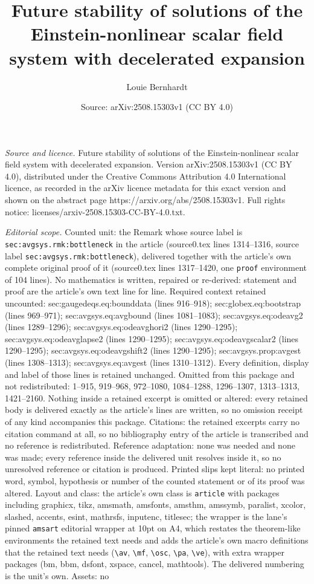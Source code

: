\documentclass[10pt,a4paper]{amsart}
\title[Future stability of solutions of the Einstein-nonlinear scal]{Future stability of solutions of the Einstein-nonlinear scalar field system with decelerated expansion}
\author{Louie Bernhardt}
\date{Source: arXiv:2508.15303v1 (CC BY 4.0)}
\begin{document}
\maketitle

\noindent\emph{Source and licence.} Future stability of solutions of the Einstein-nonlinear scalar field system with decelerated expansion. Version arXiv:2508.15303v1 (CC BY 4.0), distributed under the Creative Commons Attribution 4.0 International licence, as recorded in the arXiv licence metadata for this exact version and shown on the abstract page https://arxiv.org/abs/2508.15303v1. Full rights notice: licenses/arxiv-2508.15303-CC-BY-4.0.txt.\par\smallskip

\noindent\textit{Editorial scope.} Counted unit: the Remark whose source label is \texttt{sec:avgsys.rmk:bottleneck} in the article (source0.tex lines 1314--1316, source label \texttt{sec:avgsys.rmk:bottleneck}), delivered together with the article's own complete original proof of it (source0.tex lines 1317--1420, one \texttt{proof} environment of 104 lines). No mathematics is written, repaired or re-derived: statement and proof are the article's own text line for line. Required context retained uncounted: sec:gaugedeqs.eq:bounddata (lines 916--918); sec:globex.eq:bootstrap (lines 969--971); sec:avgsys.eq:avgbound (lines 1081--1083); sec:avgsys.eq:odeavg2 (lines 1289--1296); sec:avgsys.eq:odeavghori2 (lines 1290--1295); sec:avgsys.eq:odeavglapse2 (lines 1290--1295); sec:avgsys.eq:odeavgscalar2 (lines 1290--1295); sec:avgsys.eq:odeavgshift2 (lines 1290--1295); sec:avgsys.prop:avgest (lines 1308--1313); sec:avgsys.eq:avgest (lines 1310--1312). Every definition, display and label of those lines is retained unchanged. Omitted from this package and not redistributed: 1--915, 919--968, 972--1080, 1084--1288, 1296--1307, 1313--1313, 1421--2160. Nothing inside a retained excerpt is omitted or altered: every retained body is delivered exactly as the article's lines are written, so no omission receipt of any kind accompanies this package. Citations: the retained excerpts carry no citation command at all, so no bibliography entry of the article is transcribed and no reference is redistributed. Reference adaptation: none was needed and none was made; every reference inside the delivered unit resolves inside it, so no unresolved reference or citation is produced. Printed slips kept literal: no printed word, symbol, hypothesis or number of the counted statement or of its proof was altered. Layout and class: the article's own class is \texttt{article} with packages including graphicx, tikz, amsmath, amsfonts, amsthm, amssymb, paralist, xcolor, slashed, accents, esint, mathrsfs, inputenc, titlesec; the wrapper is the lane's pinned \texttt{amsart} editorial wrapper at 10pt on A4, which restates the theorem-like environments the retained text needs and adds the article's own macro definitions that the retained text needs (\texttt{\textbackslash av}, \texttt{\textbackslash mf}, \texttt{\textbackslash osc}, \texttt{\textbackslash pa}, \texttt{\textbackslash ve}), with extra wrapper packages (bm, bbm, dsfont, xspace, cancel, mathtools). The delivered numbering is the unit's own. Assets: no 
\end{document}
